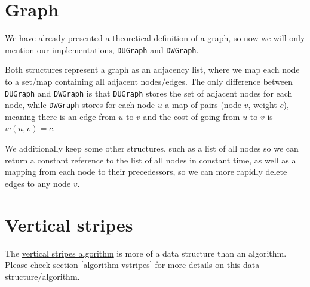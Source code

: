 \section{Graph}
We have already presented a theoretical definition of a graph, so now we will only mention our implementations, \texttt{DUGraph} and \texttt{DWGraph}.\par
Both structures represent a graph as an adjacency list, where we map each node to a set/map containing all adjacent nodes/edges. The only difference between \texttt{DUGraph} and \texttt{DWGraph} is that \texttt{DUGraph} stores the set of adjacent nodes for each node, while \texttt{DWGraph} stores for each node $u$ a map of pairs (node $v$, weight $c$), meaning there is an edge from $u$ to $v$ and the cost of going from $u$ to $v$ is $w(u,v)=c$.\par
We additionally keep some other structures, such as a list of all nodes so we can return a constant reference to the list of all nodes in constant time, as well as a mapping from each node to their precedessors, so we can more rapidly delete edges to any node $v$.

\section{Vertical stripes}
The \hyperref[algorithm-vstripes]{vertical stripes algorithm} is more of a data structure than an algorithm. Please check section \ref{algorithm-vstripes} for more details on this data structure/algorithm.